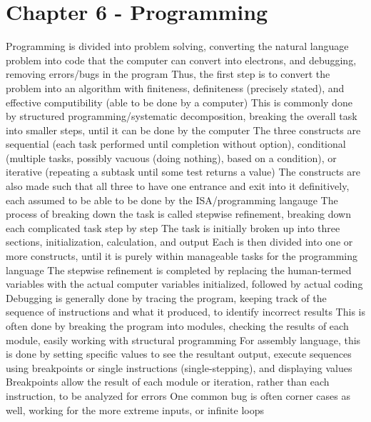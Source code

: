 \documentclass[11 pt, twoside]{article}
\newenvironment{outline*}
{
	\begin{outline}[enumerate]
	}
	{\end{outline}
}
\begin{document}
\section{Chapter 6 - Programming}
\begin{outline*}
\1 Programming is divided into problem solving, converting the natural language problem into code that the computer can convert into electrons, and debugging, removing errors/bugs in the program
\2 Thus, the first step is to convert the problem into an algorithm with finiteness, definiteness (precisely stated), and effective computibility (able to be done by a computer)
\1 This is commonly done by structured programming/systematic decomposition, breaking the overall task into smaller steps, until it can be done by the computer
\2 The three constructs are sequential (each task performed until completion without option), conditional (multiple tasks, possibly vacuous (doing nothing), based on a condition), or iterative (repeating a subtask until some test returns a value)
\2 The constructs are also made such that all three to have one entrance and exit into it definitively, each assumed to be able to be done by the ISA/programming langauge
\2 The process of breaking down the task is called stepwise refinement, breaking down each complicated task step by step
\3 The task is initially broken up into three sections, initialization, calculation, and output
\3 Each is then divided into one or more constructs, until it is purely within manageable tasks for the programming language
\2 The stepwise refinement is completed by replacing the human-termed variables with the actual computer variables initialized, followed by actual coding
\1 Debugging is generally done by tracing the program, keeping track of the sequence of instructions and what it produced, to identify incorrect results
\2 This is often done by breaking the program into modules, checking the results of each module, easily working with structural programming
\2 For assembly language, this is done by setting specific values to see the resultant output, execute sequences using breakpoints or single instructions (single-stepping), and displaying values
\3 Breakpoints allow the result of each module or iteration, rather than each instruction, to be analyzed for errors
\2 One common bug is often corner cases as well, working for the more extreme inputs, or infinite loops
\end{outline*}
\end{document}
